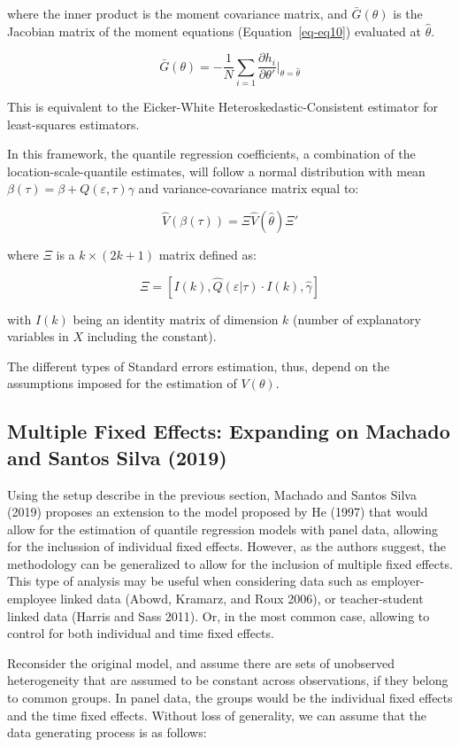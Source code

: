 \documentclass[
  letterpaper,
  DIV=11,
  numbers=noendperiod]{scrartcl}
\begin{document}
where the inner product is the moment covariance matrix, and
\(\bar{G}(\theta)\) is the Jacobian matrix of the moment equations
(Equation~\ref{eq-eq10}) evaluated at \(\hat\theta\).

\[\bar{G}(\theta) =-\frac{1}{N} \sum_{i=1} \frac{\partial h_i}{\partial \theta'} \Big|_{\theta=\hat\theta}\]

This is equivalent to the Eicker-White Heteroskedastic-Consistent
estimator for least-squares estimators.

In this framework, the quantile regression coefficients, a combination
of the location-scale-quantile estimates, will follow a normal
distribution with mean \(\beta(\tau) = \beta+Q(\varepsilon,\tau)\gamma\)
and variance-covariance matrix equal to:

\[\hat{V}(\beta(\tau)) = \Xi \hat{V}(\hat\theta) \Xi'
\]

where \(\Xi\) is a \(k \times (2k+1)\) matrix defined as:

\[\Xi = [ I(k), \hat Q(\varepsilon|\tau) \cdot I(k), \hat \gamma ]
\]

with \(I(k)\) being an identity matrix of dimension \(k\) (number of
explanatory variables in \(X\) including the constant).

The different types of Standard errors estimation, thus, depend on the
assumptions imposed for the estimation of \(V(\theta)\).

\hypertarget{multiple-fixed-effects-expanding-on-mss2019}{%
\subsection{Multiple Fixed Effects: Expanding on Machado and Santos
Silva (2019)}\label{multiple-fixed-effects-expanding-on-mss2019}}

Using the setup describe in the previous section, Machado and Santos
Silva (2019) proposes an extension to the model proposed by He (1997)
that would allow for the estimation of quantile regression models with
panel data, allowing for the inclussion of individual fixed effects.
However, as the authors suggest, the methodology can be generalized to
allow for the inclusion of multiple fixed effects. This type of analysis
may be useful when considering data such as employer-employee linked
data (Abowd, Kramarz, and Roux 2006), or teacher-student linked data
(Harris and Sass 2011). Or, in the most common case, allowing to control
for both individual and time fixed effects.

Reconsider the original model, and assume there are sets of unobserved
heterogeneity that are assumed to be constant across observations, if
they belong to common groups. In panel data, the groups would be the
individual fixed effects and the time fixed effects. Without loss of
generality, we can assume that the data generating process is as
follows:
\end{document}
